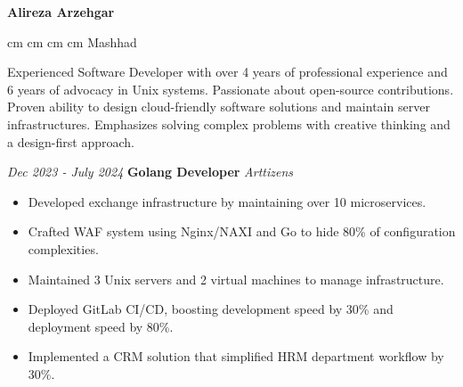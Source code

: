 \documentclass{engineercv}
\begin{document}
\begin{center}
  \textbf{\fontsize{24 pt}{24 pt}\selectfont Alireza Arzehgar}

  \vspace{0.2 cm}

  \scriptsize
  \mbox{}
   cm
  \mbox{}
   cm
  \mbox{}
   cm
  \mbox{}
   cm
  \mbox{{\color{black}\footnotesize\faMapMarker*}\hspace*{0.13cm}Mashhad}
\end{center}


Experienced Software Developer with over 4 years of professional experience and 6 years of advocacy in Unix systems.
Passionate about open-source contributions. Proven ability to design cloud-friendly software solutions and
maintain server infrastructures. Emphasizes solving complex problems with creative thinking
and a design-first approach.


\begin{twocolentry}{\textit{Dec 2023 - July 2024}}
  \textbf{Golang Developer}
  \textit{Arttizens}
\end{twocolentry}

\begin{itemize}
  \item Developed exchange infrastructure by maintaining over 10 microservices.
  \item Crafted WAF system using Nginx/NAXI and Go to hide 80\% of configuration complexities.
  \item Maintained 3 Unix servers and 2 virtual machines to manage infrastructure.
  \item Deployed GitLab CI/CD, boosting development speed by 30\% and deployment speed by 80\%.
  \item Implemented a CRM solution that simplified HRM department workflow by 30\%.
\end{itemize}
\end{document}
